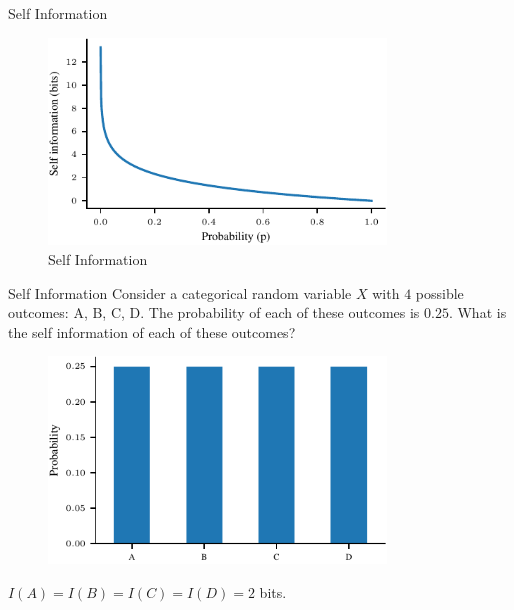 \documentclass[handout]{beamer}
\begin{document}
\begin{frame}{Self Information}
    \begin{figure}
        \centering
        \includegraphics[width=0.8\textwidth]{../figures/information-theory/self-information.pdf}
        \caption{Self Information}
        \label{fig:self_info}
    \end{figure}
\end{frame}

\begin{frame}{Self Information}
    Consider a categorical random variable $X$ with $4$ possible outcomes: A, B, C, D. The probability of each of these outcomes is $0.25$. What is the self information of each of these outcomes?
    \begin{figure}
        \centering
        \includegraphics[width=0.8\textwidth]{../figures/information-theory/categorical-uniform.pdf}
        \label{fig:self_info_categorical_uniform}
    \end{figure}

    $I(A) = I(B) = I(C) = I(D) = 2$ bits.

\end{frame}
\end{document}
